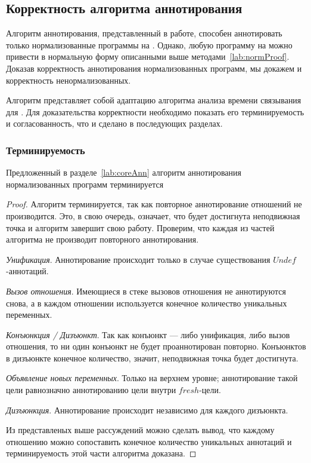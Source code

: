 \subsection{Корректность алгоритма аннотирования}

Алгоритм аннотирования, представленный в работе, способен аннотировать только нормализованные программы на \miniKanren{}.
Однако, любую программу на \miniKanren{} можно привести в нормальную форму описанными выше методами~\ref{lab:normProof}.
Доказав корректность аннотирования нормализованных программ, мы докажем и корректность ненормализованных.

Алгоритм представляет собой адаптацию алгоритма анализа времени связывания для \miniKanren{}.
Для доказательства корректности необходимо показать его терминируемость и согласованность, что и сделано в последующих разделах.


\subsubsection{Терминируемость}

\begin{theorem}
Предложенный в разделе~\ref{lab:coreAnn} алгоритм аннотирования нормализованных программ терминируется
\end{theorem}

\begin{proof}
Алгоритм терминируется, так как повторное аннотирование отношений не производится.
Это, в свою очередь, означает, что будет достигнута неподвижная точка и алгоритм завершит свою работу.
Проверим, что каждая из частей алгоритма не производит повторного аннотирования.

\textit{Унификация}.
Аннотирование происходит только в случае существования $Undef$-аннотаций.

\textit{Вызов отношения}.
Имеющиеся в стеке вызовов отношения не аннотируются снова, а в каждом отношении используется конечное количество уникальных переменных.

\textit{Конъюнкция / Дизъюнкт}.
Так как конъюнкт --- либо унификация, либо вызов отношения, то ни один конъюнкт не будет проаннотирован повторно.
Конъюнктов в дизъюнкте конечное количество, значит, неподвижная точка будет достигнута.

\textit{Объявление новых переменных}.
Только на верхнем уровне; аннотирование такой цели равнозначно аннотированию цели внутри $fresh$-цели.

\textit{Дизъюнкция}.
Аннотирование происходит независимо для каждого дизъюнкта.

Из представленых выше рассуждений можно сделать вывод, что каждому отношению можно сопоставить конечное количество уникальных аннотаций и терминируемость этой части алгоритма доказана.
\end{proof}

